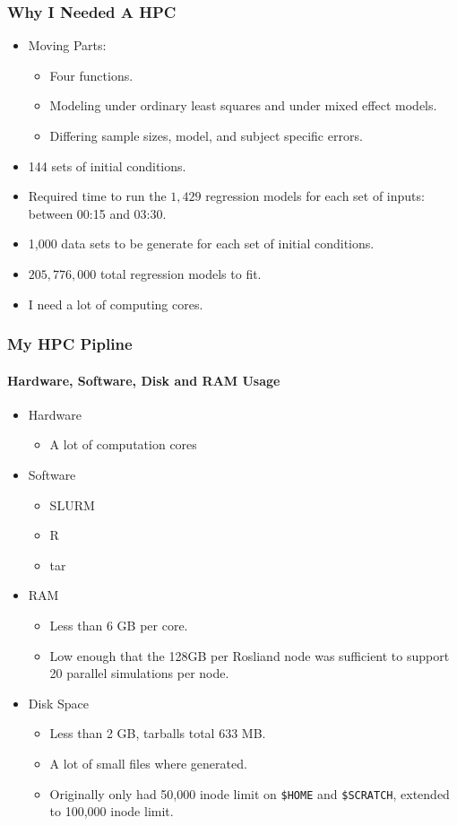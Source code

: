 \documentclass[10pt]{beamer}
\begin{document}
\begin{frame}[t]
  \frametitle{Why I Needed A HPC}
  \begin{itemize}
    \item Moving Parts:
      \begin{itemize}
        \item Four functions.
        \item Modeling under ordinary least squares and under mixed effect models.
        \item Differing sample sizes, model, and subject specific errors.
      \end{itemize}
    \item 144 sets of initial conditions.
    \item Required time to run the $1,429$ regression models for each set of
      inputs: between 00:15 and 03:30.
    \item 1,000 data sets to be generate for each set of initial conditions.  
    \item $205,776,000$ total regression models to fit.
    \item I need a lot of computing cores.
  \end{itemize}
\end{frame}

\begin{frame}
  \frametitle{My HPC Pipline}
  \framesubtitle{Hardware, Software, Disk and RAM Usage}
  \begin{itemize}
    \item Hardware
      \begin{itemize}
        \item A lot of computation cores
      \end{itemize}

    \item Software
      \begin{itemize}
        \item SLURM
        \item R
        \item tar
      \end{itemize}

    \item RAM
      \begin{itemize}
        \item Less than 6 GB per core.
        \item Low enough that the 128GB per Rosliand node was sufficient to
          support 20 parallel simulations per node.
      \end{itemize}

    \item Disk Space
      \begin{itemize}
        \item Less than 2 GB, tarballs total 633 MB.
        \item A lot of small files where generated.
        \item Originally only had 50,000 inode limit on {\tt \$HOME} and
          {\tt \$SCRATCH}, extended to 100,000 inode limit.
      \end{itemize}
  \end{itemize} 
\end{frame}
\end{document}

